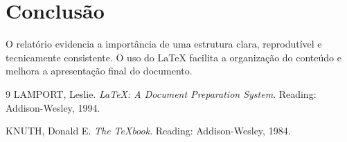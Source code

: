 \documentclass[12pt,a4paper]{report}
\begin{document}
\chapter{Conclusão}
O relatório evidencia a importância de uma estrutura clara, reprodutível e tecnicamente consistente. O uso do \LaTeX{} facilita a organização do conteúdo e melhora a apresentação final do documento.

\begin{thebibliography}{9}
LAMPORT, Leslie. \textit{LaTeX: A Document Preparation System}. Reading: Addison-Wesley, 1994.

KNUTH, Donald E. \textit{The TeXbook}. Reading: Addison-Wesley, 1984.
\end{thebibliography}
\end{document}
